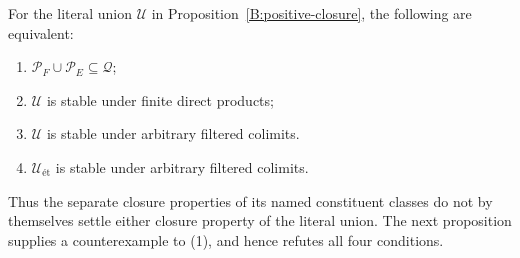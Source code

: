 \begin{proposition}
\label{B:closure-reduction}
For the literal union $\mathcal U$ in
Proposition~\ref{B:positive-closure}, the following are equivalent:
\begin{enumerate}
 \item $\mathcal P_F\cup\mathcal P_E\subseteq\mathcal Q$;
 \item $\mathcal U$ is stable under finite direct products;
 \item $\mathcal U$ is stable under arbitrary filtered colimits.
 \item $\mathcal U_{\text{ét}}$ is stable under arbitrary
 filtered colimits.
\end{enumerate}
Thus the separate closure properties of its named constituent
classes do not by themselves settle either closure property of
the literal union. The next proposition supplies a counterexample
to (1), and hence refutes all four conditions.
\end{proposition}

